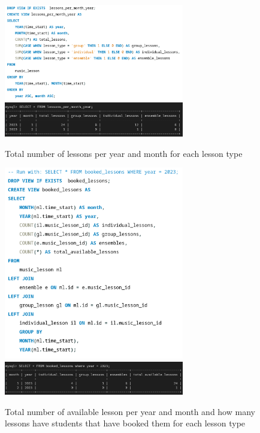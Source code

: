 \documentclass[a4paper]{scrreprt}
\begin{document}
\begin{figure}[h]
    \begin{center}
        \includegraphics[width=0.70\textwidth]{../img/lessonSQLv2.png} \\
        \includegraphics[width=0.70\textwidth]{../img/lessonV2.png}
        \caption{Total number of lessons per year and month for each lesson type}
        \label{fig:lessons}
    \end{center}
\end{figure}
\begin{figure}[h]
    \begin{center}
        \includegraphics[width=0.70\textwidth]{../img/bookedLessonSQL.png} \\
        \includegraphics[width=0.70\textwidth]{../img/bookedLessons.png}
        \caption{Total number of available lesson per year and month and how many lessons have students that have booked them for each lesson type}
        \label{fig:booked}
    \end{center}
\end{figure}
\end{document}
